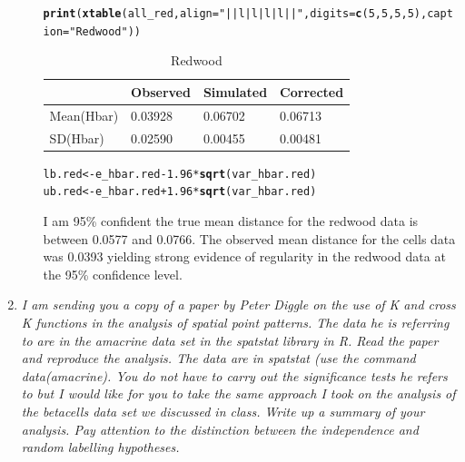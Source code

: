 \documentclass{article}\usepackage[]{graphicx}\usepackage[]{color}
\makeatletter
\newcommand{\hlnum}[1]{\textcolor[rgb]{0.686,0.059,0.569}{#1}}%
\newcommand{\hlstr}[1]{\textcolor[rgb]{0.192,0.494,0.8}{#1}}%
\newcommand{\hlopt}[1]{\textcolor[rgb]{0,0,0}{#1}}%
\newcommand{\hlstd}[1]{\textcolor[rgb]{0.345,0.345,0.345}{#1}}%
\newcommand{\hlkwb}[1]{\textcolor[rgb]{0.69,0.353,0.396}{#1}}%
\newcommand{\hlkwc}[1]{\textcolor[rgb]{0.333,0.667,0.333}{#1}}%
\newcommand{\hlkwd}[1]{\textcolor[rgb]{0.737,0.353,0.396}{\textbf{#1}}}%
\newenvironment{kframe}{%
 \def\at@end@of@kframe{}%
 \ifinner\ifhmode%
  \def\at@end@of@kframe{\end{minipage}}%
  \begin{minipage}{\columnwidth}%
 \fi\fi%
 \def\FrameCommand##1{\hskip\@totalleftmargin \hskip-\fboxsep
 \colorbox{shadecolor}{##1}\hskip-\fboxsep
     \hskip-\linewidth \hskip-\@totalleftmargin \hskip\columnwidth}%
 \MakeFramed {\advance\hsize-\width
   \@totalleftmargin\z@ \linewidth\hsize
   \@setminipage}}%
 {\par\unskip\endMakeFramed%
 \at@end@of@kframe}
\newenvironment{knitrout}{}{} %
\makeatother
\begin{document}
\begin{enumerate}
\begin{enumerate}
\begin{kframe}
\begin{alltt}
\hlkwd{print}\hlstd{(}\hlkwd{xtable}\hlstd{(all_red,} \hlkwc{align} \hlstd{=} \hlstr{"||l|l|l|l||"}\hlstd{,} \hlkwc{digits} \hlstd{=} \hlkwd{c}\hlstd{(}\hlnum{5}\hlstd{,}\hlnum{5}\hlstd{,}\hlnum{5}\hlstd{,}\hlnum{5}\hlstd{),} \hlkwc{caption} \hlstd{=} \hlstr{"Redwood"}\hlstd{))}
\end{alltt}
\end{kframe}%
\begin{table}[ht]
\centering
\begin{tabular}{||l|l|l|l||}
  \hline
 & Observed & Simulated & Corrected \\ 
  \hline
Mean(Hbar) & 0.03928 & 0.06702 & 0.06713 \\ 
  SD(Hbar) & 0.02590 & 0.00455 & 0.00481 \\ 
   \hline
\end{tabular}
\caption{Redwood} 
\end{table}


\begin{knitrout}\footnotesize
{}\color{fgcolor}\begin{kframe}
\begin{alltt}
\hlstd{lb.red} \hlkwb{<-} \hlstd{e_hbar.red} \hlopt{-} \hlnum{1.96}\hlopt{*}\hlkwd{sqrt}\hlstd{(var_hbar.red)}
\hlstd{ub.red} \hlkwb{<-} \hlstd{e_hbar.red} \hlopt{+} \hlnum{1.96}\hlopt{*}\hlkwd{sqrt}\hlstd{(var_hbar.red)}
\end{alltt}
\end{kframe}
\end{knitrout}

I am 95\% confident the true mean distance for the redwood data is between 0.0577 and 0.0766. The observed mean distance for the cells data was 0.0393 yielding strong evidence of regularity in the redwood data at the 95\% confidence level.

\end{enumerate}

\item %
{\it I am sending you a copy of a paper by Peter Diggle on the use of K and cross K functions in the analysis of spatial point patterns. The data he is referring to are in the amacrine data set in the spatstat library in R. Read the paper and reproduce the analysis. The data are in spatstat (use the command data(amacrine). You do not have to carry out the significance tests he refers to but I would like for you to take the same approach I took on the analysis of the betacells data set we discussed in class. Write up a summary of your analysis. Pay attention to the distinction between the independence and random labelling hypotheses.}


\end{enumerate}
\end{document}
